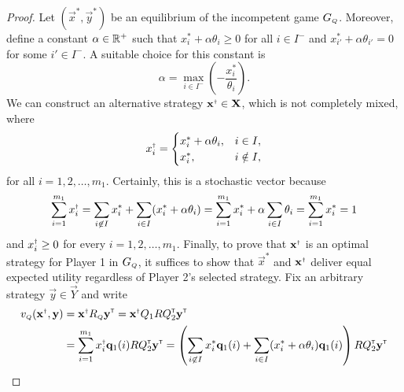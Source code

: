 \begin{proof}
        Let $(\vec{x}^*, \vec{y}^*)$ be an equilibrium of the incompetent game $G_\ms{Q}$.
        Moreover, define a constant $\alpha \in \mathbb{R}^+$ such that $x^*_i + \alpha \theta_i \ge 0$ for all $i \in I^-$ and $x^*_{i'} + \alpha \theta_{i'} = 0$ for some $i' \in I^-$.
        A suitable choice for this constant is
        \begin{equation} \label{temp:non-singular-incompetence-matrices-4}
            \alpha
                = \max_{i \in I^-} \left(-\frac{x_i^*}{\theta_i}\right).
        \end{equation}
        We can construct an alternative strategy $\vec{x}^\sdagger \in \vec{X}$, which is not completely mixed, where
        \begin{equation} \label{temp:non-singular-incompetence-matrices-5}
            x^\sdagger_i
                =
                \begin{cases}
                    x^*_i + \alpha \theta_i, & i \in I, \\
                    x^*_i, & i \notin I, \\
                \end{cases}
        \end{equation}
        for all $i = 1, 2, \ldots, m_1$.
        Certainly, this is a stochastic vector because
        \begin{equation}
            \sum_{i = 1}^{m_1} x^\sdagger_i
                = \sum_{i \not\in I} x^*_i + \sum_{i \in I} (x^*_i + \alpha \theta_i)
                = \sum_{i = 1}^{m_1} x^*_i + \alpha \sum_{i \in I} \theta_i
                = \sum_{i = 1}^{m_1} x^*_i
                = 1
        \end{equation}
        and $x^\sdagger_i \ge 0$ for every $i = 1, 2, \ldots, m_1$.
        Finally, to prove that $\vec{x}^\sdagger$ is an optimal strategy for Player 1 in $G_\ms{Q}$, it suffices to show that $\vec{x}^*$ and $\vec{x}^\sdagger$ deliver equal expected utility regardless of Player 2's selected strategy.
        Fix an arbitrary strategy $\vec{y} \in \vec{Y}$ and write
        \begin{equation}
        \begin{split}
            v_\ms{Q}(\vec{x}^\sdagger, \vec{y})
                & = \vec{x}^\sdagger R_\ms{Q} \vec{y}^\transp
                = \vec{x}^\sdagger Q_1 R Q_2^\transp \vec{y}^\transp \\
                & = \sum_{i = 1}^{m_1} x^\sdagger_i \vec{q}_1(i) R Q_2^\transp \vec{y}^\transp
                = \left(\sum_{i \not\in I} x^*_i \vec{q}_1(i) + \sum_{i \in I} (x^*_i + \alpha \theta_i) \vec{q}_1(i) \right) R Q_2^\transp \vec{y}^\transp \\

\end{split}
\end{equation}
\end{proof}
